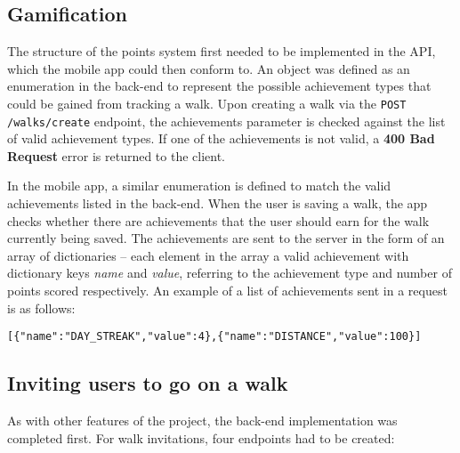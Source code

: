 
\subsection{Gamification} \label{subsection:gamification}

The structure of the points system first needed to be implemented in the API, which the mobile app could then conform to. An object was defined as an enumeration in the back-end to represent the possible achievement types that could be gained from tracking a walk. Upon creating a walk via the \texttt{POST /walks/create} endpoint, the achievements parameter is checked against the list of valid achievement types. If one of the achievements is not valid, a \textbf{400 Bad Request} error is returned to the client.


In the mobile app, a similar enumeration is defined to match the valid achievements listed in the back-end. When the user is saving a walk, the app checks whether there are achievements that the user should earn for the walk currently being saved. The achievements are sent to the server in the form of an array of dictionaries -- each element in the array a valid achievement with dictionary keys \textit{name} and \textit{value}, referring to the achievement type and number of points scored respectively. An example of a list of achievements sent in a request is as follows:

\begin{center}
  \verb|[{"name":"DAY_STREAK","value":4},{"name":"DISTANCE","value":100}]|
\end{center}


\subsection{Inviting users to go on a walk}


As with other features of the project, the back-end implementation was completed first. For walk invitations, four endpoints had to be created:

